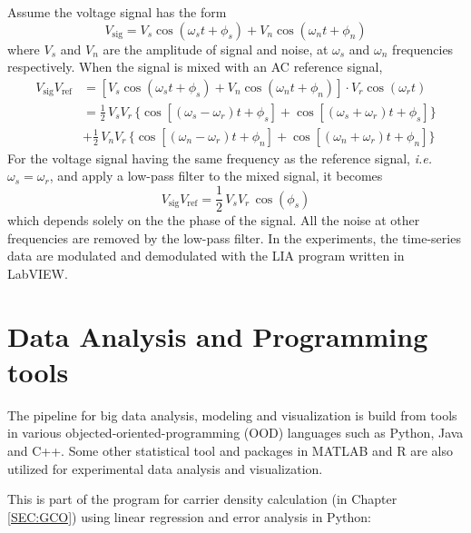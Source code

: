 \documentclass[pdflatex, sectionletters, 12pt, final, phd]{pittetd}    %
\begin{document}
Assume the voltage signal has the form
$$
V_\mathrm{sig} = V_s \cos(\omega_s t + \phi_s) + V_n \cos(\omega_n t + \phi_n)
$$
where $V_s$ and $V_n$ are the amplitude of signal and noise, at $\omega_s$ and $\omega_n$ frequencies respectively. When the signal is mixed with an AC reference signal, 
\begin{equation*}
\begin{split}
V_\mathrm{sig} V_\mathrm{ref} & = [V_s \cos(\omega_s t + \phi_s) + V_n \cos(\omega_n t + \phi_n)]\cdot V_r \cos(\omega_r t) \\
& = \frac{1}{2} \, V_s V_r \, \{\cos[(\omega_s - \omega_r)t + \phi_s] + \cos[(\omega_s + \omega_r)t + \phi_s]\} \\
& + \frac{1}{2} \, V_n V_r \, \{\cos[(\omega_n - \omega_r)t + \phi_n] + \cos[(\omega_n + \omega_r)t + \phi_n]\}
\end{split}
\end{equation*}
For the voltage signal having the same frequency as the reference signal, \textit{i.e.} $\omega_s = \omega_r$, and apply a low-pass filter to the mixed signal, it becomes
$$
V_\mathrm{sig}V_\mathrm{ref} = \frac{1}{2} \, V_s V_r \, \cos(\phi_s)
$$ 
which depends solely on the the phase of the signal. All the noise at other frequencies are removed by the low-pass filter. In the experiments, the time-series data are modulated and demodulated with the LIA program written in LabVIEW.

\section{Data Analysis and Programming tools}

The pipeline for big data analysis, modeling and visualization is build from tools in various objected-oriented-programming (OOD) languages such as Python, Java and C++. Some other statistical tool and packages in MATLAB and R are also utilized for experimental data analysis and visualization. 

This is part of the program for carrier density calculation (in Chapter \ref{SEC:GCO}) using linear regression and error analysis in Python:
\end{document}
